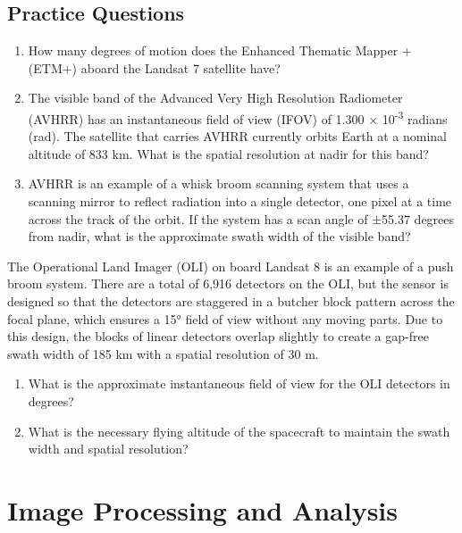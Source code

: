 \documentclass[
]{book}
\providecommand{\tightlist}{%
  \setlength{\itemsep}{0pt}\setlength{\parskip}{0pt}}
\begin{document}
\section*{Practice Questions}\label{practice-questions-3}

\begin{enumerate}
\def\labelenumi{\arabic{enumi}.}
\tightlist
\item
  How many degrees of motion does the Enhanced Thematic Mapper + (ETM+) aboard the Landsat 7 satellite have?
\item
  The visible band of the Advanced Very High Resolution Radiometer (AVHRR) has an instantaneous field of view (IFOV) of 1.300 × 10\textsuperscript{-3} radians (rad). The satellite that carries AVHRR currently orbits Earth at a nominal altitude of 833 km. What is the spatial resolution at nadir for this band?
\item
  AVHRR is an example of a whisk broom scanning system that uses a scanning mirror to reflect radiation into a single detector, one pixel at a time across the track of the orbit. If the system has a scan angle of ±55.37 degrees from nadir, what is the approximate swath width of the visible band?
\end{enumerate}

The Operational Land Imager (OLI) on board Landsat 8 is an example of a push broom system. There are a total of 6,916 detectors on the OLI, but the sensor is designed so that the detectors are staggered in a butcher block pattern across the focal plane, which ensures a 15° field of view without any moving parts. Due to this design, the blocks of linear detectors overlap slightly to create a gap-free swath width of 185 km with a spatial resolution of 30 m.

\begin{enumerate}
\def\labelenumi{\arabic{enumi}.}
\setcounter{enumi}{3}
\tightlist
\item
  What is the approximate instantaneous field of view for the OLI detectors in degrees?
\item
  What is the necessary flying altitude of the spacecraft to maintain the swath width and spatial resolution?
\end{enumerate}

\chapter{Image Processing and Analysis}\label{image-processing-and-analysis}
\end{document}
